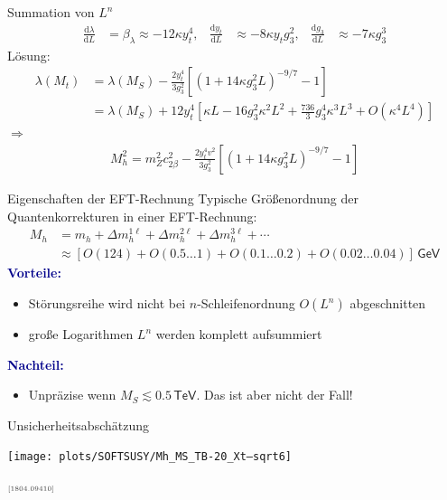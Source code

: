\documentclass[hyperref={pdfpagelabels=false},ngerman]{beamer}
\newcommand{\eh}[1]{\,\mathsf{#1}}
\newcommand{\MS}{\ensuremath{M_S}}
\newcommand{\mycite}[1]{\ensuremath{\text{\textcolor{darkgray}{\tiny [#1]}}}}
\renewcommand{\emph}[1]{\textbf{\textcolor{darkblue}{#1}}}
\newcommand{\dd}{\text{d}}
\newcommand{\TeV}{\eh{TeV}}
\begin{document}
\begin{frame}{Summation von $L^n$}
  \begin{align*}
    \frac{\dd\lambda}{\dd L} &= \beta_\lambda \approx -12 \kappa y_t^4 , &
    \frac{\dd y_t}{\dd L} &\approx -8 \kappa y_t g_3^2 , &
    \frac{\dd g_3}{\dd L} &\approx -7 \kappa g_3^3
  \end{align*}
  Lösung:
  \begin{align*}
    \lambda(M_t) &= \lambda(\MS)
                   - \frac{2 y_t^4}{3 g_3^2} \left[
                   \left( 1 + 14 \kappa g_3^2 L \right)^{-9/7} - 1
    \right] \\
                 &= \lambda(\MS)
                   + 12 y_t^4 \left[
                   \kappa L - 16 g_3^2 \kappa^2 L^2 + \frac{736}{3} g_3^4 \kappa^3 L^3 + O(\kappa^4L^4)
                   \right]
  \end{align*}
  $\Rightarrow$
  \begin{align*}
    M_h^2 = m_Z^2 c^2_{2\beta}
    - \frac{2 y_t^4 v^2}{3 g_3^2} \left[
    \left( 1 + 14 \kappa g_3^2 L \right)^{-9/7} - 1
    \right]
  \end{align*}
\end{frame}

\begin{frame}{Eigenschaften der EFT-Rechnung}
  Typische Größenordnung der Quantenkorrekturen in einer EFT-Rechnung:
  \begin{align*}
    M_h &= m_h + \Delta m_h^{1\ell} + \Delta m_h^{2\ell} + \Delta m_h^{3\ell} + \cdots \\
    &\approx [O(124) + O(0.5\ldots 1) + O(0.1\ldots 0.2) + O(0.02\ldots 0.04)] \eh{GeV}
  \end{align*}
  \emph{Vorteile:}
  \begin{itemize}
  \item Störungsreihe wird nicht bei $n$-Schleifenordnung $O(L^n)$
    abgeschnitten
  \item große Logarithmen $L^n$ werden komplett aufsummiert
  \end{itemize}
  \vspace*{1em}
  \emph{Nachteil:}
  \begin{itemize}
  \item Unpräzise wenn  $\MS \lesssim 0.5\TeV$.
    Das ist aber nicht der Fall!
  \end{itemize}
\end{frame}

\begin{frame}{Unsicherheitsabschätzung}
  \begin{center}
    \texttt{[image: plots/SOFTSUSY/Mh\_MS\_TB-20\_Xt--sqrt6]}
  \end{center}
  \raggedleft\mycite{1804.09410}
\end{frame}
\end{document}
